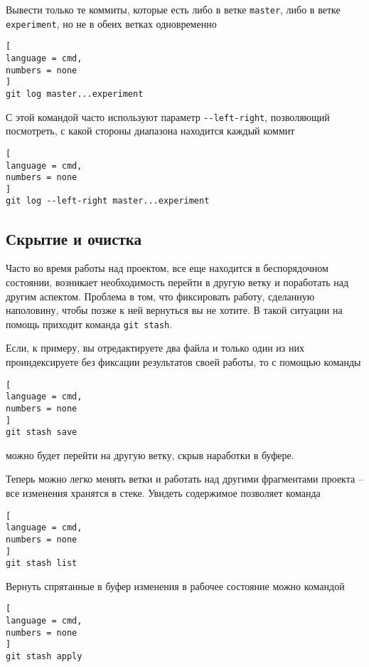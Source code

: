 \documentclass[%
	11pt,
	a4paper,
	utf8,
		]{article}
\begin{document}
Вывести только те коммиты, которые есть либо в ветке \texttt{master}, либо в ветке \texttt{experiment}, но не в обеих ветках одновременно

\begin{lstlisting}[
language = cmd,
numbers = none
]
git log master...experiment
\end{lstlisting}

С этой командой часто используют параметр \lstinline{--left-right}, позволяющий посмотреть, с какой стороны диапазона находится каждый коммит

\begin{lstlisting}[
language = cmd,
numbers = none
]
git log --left-right master...experiment
\end{lstlisting}

\subsection{Скрытие и очистка}

Часто во время работы над проектом, все еще находится в беспорядочном состоянии, возникает необходимость перейти в другую ветку и поработать над другим аспектом. Проблема в том, что фиксировать работу, сделанную наполовину, чтобы позже к ней вернуться вы не хотите. В такой ситуации на помощь приходит команда \texttt{git stash}.

Если, к примеру, вы отредактируете два файла и только один из них проиндексируете без фиксации результатов своей работы, то с помощью команды
\begin{lstlisting}[
language = cmd,
numbers = none
]
git stash save
\end{lstlisting}
можно будет перейти на другую ветку, скрыв наработки в буфере.


Теперь можно легко менять ветки и работать над другими фрагментами проекта -- все изменения хранятся в стеке. Увидеть содержимое позволяет команда

\begin{lstlisting}[
language = cmd,
numbers = none
]
git stash list
\end{lstlisting}

Вернуть спрятанные в буфер изменения в рабочее состояние можно командой

\begin{lstlisting}[
language = cmd,
numbers = none
]
git stash apply
\end{lstlisting}
\end{document}
